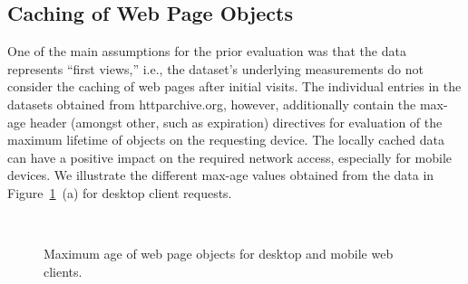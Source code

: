 \documentclass[onecolumn,12pt]{IEEEtran}
\begin{document}
\subsection{Caching of Web Page Objects}
One of the main assumptions for the prior evaluation was that the data represents ``first views,'' i.e., the dataset's underlying measurements do not consider the caching of web pages after initial visits. 
The individual entries in the datasets obtained from httparchive.org, however, additionally contain the max-age header (amongst other, such as expiration) directives for evaluation of the maximum lifetime of objects on the requesting device. The locally cached data can have a positive impact on the required network access, especially for mobile devices.
We illustrate the different max-age values obtained from the data in Figure~\ref{fig:maxage}~(a) for desktop client requests.
\begin{figure}
	\centering
	\qquad
	\\
	\caption{Maximum age of web page objects for desktop and mobile web clients.\label{fig:maxage}}
\end{figure}
\end{document}
